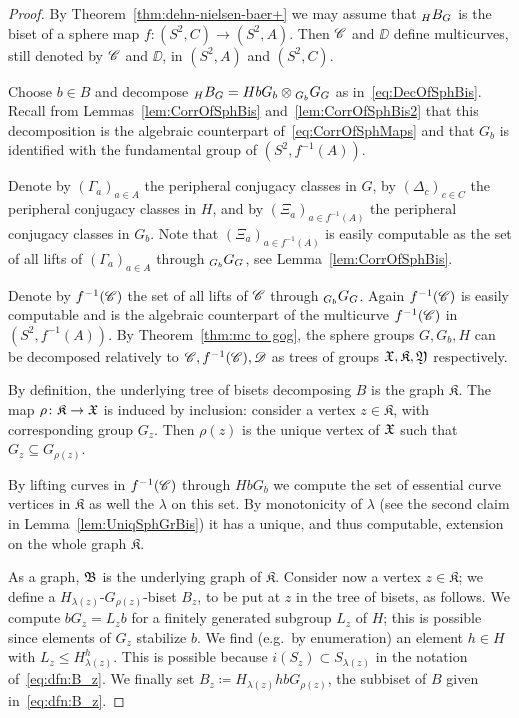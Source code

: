 \documentclass{amsart}
\begin{document}
\begin{proof}
  By Theorem~\ref{thm:dehn-nielsen-baer+} we may assume that $\subscript H B_G$
  is the biset of a sphere map $f\colon (S^2,C)\to (S^2,A)$. Then
  ${\mathscr C}$ and $\DD$ define multicurves, still denoted by ${\mathscr C}$ and
  $\DD$, in $(S^2,A)$ and $(S^2,C)$.

  Choose $b\in B$ and decompose $\subscript H B_G = H b G_b \otimes \subscript{G_b} G_G$
  as in~\eqref{eq:DecOfSphBis}. Recall from
  Lemmas~\ref{lem:CorrOfSphBis} and~\ref{lem:CorrOfSphBis2} that this
  decomposition is the algebraic counterpart
  of~\eqref{eq:CorrOfSphMaps} and that $G_b$ is identified with the
  fundamental group of $(S^2,f^{-1}(A))$.

  Denote by $(\Gamma_a)_{a\in A}$ the peripheral conjugacy classes in
  $G$, by $(\Delta_c)_{c\in C}$ the peripheral conjugacy classes in
  $H$, and by $(\Xi_a)_{a\in f^{-1}( A)}$ the peripheral conjugacy
  classes in $G_b$. Note that $(\Xi_a)_{a\in f^{-1}( A)}$ is easily
  computable as the set of all lifts of $(\Gamma_a)_{a\in A}$ through
  $\subscript{G_b}{G}_G$, see Lemma~\ref{lem:CorrOfSphBis}.

  Denote by $f^{-1}({\mathscr C})$ the set of all lifts of ${\mathscr C}$ through
  $\subscript{G_b}{G}_G$. Again $f^{-1}({\mathscr C})$ is easily computable and is the
  algebraic counterpart of the multicurve $f^{-1}( {\mathscr C})$ in
  $(S^2,f^{-1}( A))$.  By Theorem~\ref{thm:mc to gog}, the sphere
  groups $G,G_b,H$ can be decomposed relatively to ${\mathscr C},f^{-1}( {\mathscr C}),{\mathscr D}$
  as trees of groups ${\mathfrak X},\mathfrak K,{\mathfrak Y}$ respectively.
  
  By definition, the underlying tree of bisets decomposing $B$ is the
  graph $\mathfrak K$. The map $\rho\colon\mathfrak K\to{\mathfrak X}$ is
  induced by inclusion: consider a vertex $z\in\mathfrak K$, with
  corresponding group $G_z$. Then $\rho(z)$ is the unique vertex of
  ${\mathfrak X}$ such that $G_z\subseteq G_{\rho(z)}$.

  By lifting curves in $f^{-1}({\mathscr C})$ through $H b G_b$ we compute the
  set of essential curve vertices in $\mathfrak K$ as well the
  $\lambda$ on this set. By monotonicity of $\lambda$ (see the second
  claim in Lemma~\ref{lem:UniqSphGrBis}) it has a unique, and thus
  computable, extension on the whole graph $\mathfrak K$.

  As a graph, ${\mathfrak B}$ is the underlying graph of $\mathfrak K$.
  Consider now a vertex $z\in\mathfrak K$; we define a
  $H_{\lambda(z)}$-$G_{\rho(z)}$-biset $B_z$, to be put at $z$ in the
  tree of bisets, as follows. We compute $b G_z=L_z b$ for a finitely
  generated subgroup $L_z$ of $H$; this is possible since elements of
  $G_z$ stabilize $b$. We find (e.g.\ by enumeration) an element
  $h\in H$ with $L_z\le H_{\lambda(z)}^h$. This is possible because
  $i(S_z)\subset S_{\lambda(z)}$ in the notation
  of~\eqref{eq:dfn:B_z}. We finally set
  $B_z\coloneqq H_{\lambda(z)}h b G_{\rho(z)}$, the subbiset of $B$
  given in~\eqref{eq:dfn:B_z}.
\end{proof}
\end{document}
